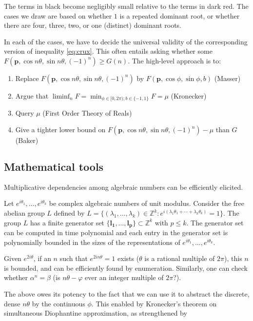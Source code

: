The terms in black become negligibly small relative to the terms in dark red. The cases we draw are based on whether $1$ is a repeated dominant root, or whether there are four, three, two, or one (distinct) dominant roots.

In each of the cases, we have to decide the universal validity of the corresponding version of inequality \ref{eq:crux}. This often entails asking whether some $F(\mathbf{p}, \cos n\theta, \sin n\theta, (-1)^n) \ge G(n)$. The high-level approach is to:
\begin{enumerate}
\item Replace $F(\mathbf{p}, \cos n\theta, \sin n\theta, (-1)^n)$ by $F(\mathbf{p}, \cos \phi, \sin \phi, b)$ (Masser)
\item Argue that $\liminf_n F = \min_{\phi \in [0, 2\pi); b\in\{-1, 1\}} F = \mu$ (Kronecker)
\item Query $\mu$ (First Order Theory of Reals)
\item Give a tighter lower bound on $F(\mathbf{p}, \cos n\theta, \sin n\theta, (-1)^n) - \mu$ than $G$ (Baker) 
\end{enumerate}

\subsection{Mathematical tools}
\label{arsenal}
Multiplicative dependencies among algebraic numbers can be efficiently elicited. 
 \begin{theorem}
  \label{thm:abelian}
  Let $e^{i \theta_1},...,e^{i \theta_k}$ be complex algebraic numbers of unit modulus. Consider the free abelian group $L$ defined by $L = \{(\lambda_1, \ldots ,\lambda_k) \in \mathbb{Z}^k: 
  e^{i (\lambda_1 \theta_1 + \cdots +  \lambda_k \theta_k)} = 1 \}$. 
  The group $L$ has a finite generator set $\{ \mathbf{l_1}, \ldots, \mathbf{l_p}\} \subset \mathbb{Z}^k$ with $p \le k$. The generator set can be computed in time polynomial and
  each entry in the generator set is polynomially bounded in the sizes of the representations of $e^{i \theta_1},...,e^{i \theta_k}$.
  \end{theorem}
 Given $e^{2i\theta}$, if an $n$ such that $e^{2i n \theta} = 1$ exists ($\theta$ is a rational multiple of $2\pi$), this $n$ is bounded, and can be efficiently found by enumeration. Similarly, one can check whether $\alpha^n = \beta$ (is $n\theta - \varphi$ ever an integer multiple of $2\pi$?). 
 
 The above owes its potency to the fact that we can use it to abstract the discrete, dense $n\theta$ by the continuous $\phi$. This enabled by Kronecker's theorem on simultaneous Diophantine approximation, as strengthened by \cite{joeljames3, ouaknine2014positivity}
 
